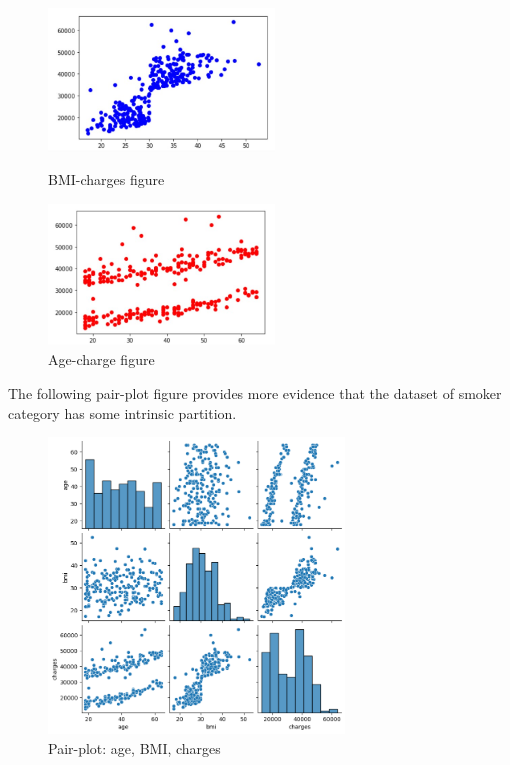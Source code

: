 \documentclass[12pt,a4paper]{article}
\begin{document}
\begin{figure}[H]
\centering
\begin{minipage}[t]{0.48\textwidth}
\centering
\includegraphics[width=6cm]{bmi-charge smoker.jpg}
\caption{BMI-charges figure}
\end{minipage}
\begin{minipage}[t]{0.48\textwidth}
\centering
\includegraphics[width=6cm]{age-chargesmoker.jpg}
\caption{Age-charge figure}
\end{minipage}
\end{figure}

The following pair-plot figure provides more evidence that the dataset of smoker category has some intrinsic partition.

\begin{figure}[H]
\centering
\includegraphics[width = 0.7\textwidth]{pairplot.png}
\caption{Pair-plot: age, BMI, charges}
\end{figure}
\end{document}
